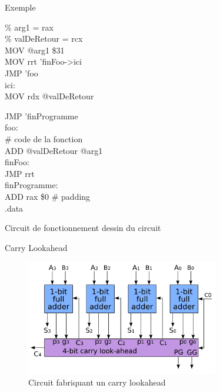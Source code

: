 \documentclass[12pt]{beamer}
\begin{document}
\begin{frame}{Exemple}

    \begin{minipage}[t]{0.48\linewidth}

\% arg1 = rax\\
\% valDeRetour = rcx\\


MOV @arg1 \$31\\
MOV rrt 'finFoo->ici\\
JMP 'foo\\
ici:\\
MOV rdx @valDeRetour\\

    \end{minipage}\hfill
    \begin{minipage}[t]{0.48\linewidth}
JMP 'finProgramme\\

foo:\\
\# code de la fonction\\
ADD @valDeRetour @arg1\\
finFoo:\\
JMP rrt\\


finProgramme:\\
ADD rax \$0  \# padding\\

.data
        \end{minipage}

\end{frame}


\begin{frame}{Circuit de fonctionnement}
    dessin du circuit
\end{frame}


\begin{frame}{Carry Lookahead}
    \begin{figure}
        \centering
            \includegraphics[width=0.75\textwidth]{carry.png}
            \caption{Circuit fabriquant un carry lookahead}
            \label{fig:question}
        \end{figure}
\end{frame}
\end{document}
